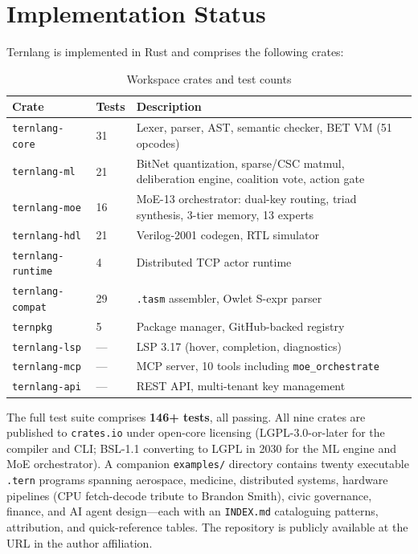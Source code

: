 \documentclass[journal,10pt,twocolumn]{IEEEtran}
\begin{document}
\section{Implementation Status}
\label{sec:status}

Ternlang is implemented in Rust and comprises the following crates:

\begin{table}[h]
\centering
\small
\caption{Workspace crates and test counts}
\label{tab:status}
\begin{tabular}{p{2.4cm}lp{4.0cm}}
\toprule
Crate & Tests & Description \\
\midrule
\texttt{ternlang-core}    & 31  & Lexer, parser, AST, semantic checker, BET VM (51 opcodes) \\
\texttt{ternlang-ml}      & 21  & BitNet quantization, sparse/CSC matmul, deliberation engine, coalition vote, action gate \\
\texttt{ternlang-moe}     & 16  & MoE-13 orchestrator: dual-key routing, triad synthesis, 3-tier memory, 13 experts \\
\texttt{ternlang-hdl}     & 21  & Verilog-2001 codegen, RTL simulator \\
\texttt{ternlang-runtime} & 4   & Distributed TCP actor runtime \\
\texttt{ternlang-compat}  & 29  & \texttt{.tasm} assembler, Owlet S-expr parser \\
\texttt{ternpkg}          & 5   & Package manager, GitHub-backed registry \\
\texttt{ternlang-lsp}     & ---  & LSP 3.17 (hover, completion, diagnostics) \\
\texttt{ternlang-mcp}     & ---  & MCP server, 10 tools including \texttt{moe\_orchestrate} \\
\texttt{ternlang-api}     & ---  & REST API, multi-tenant key management \\
\bottomrule
\end{tabular}
\end{table}

The full test suite comprises \textbf{146+ tests}, all passing.
All nine crates are published to \texttt{crates.io} under open-core
licensing (LGPL-3.0-or-later for the compiler and CLI; BSL-1.1 converting
to LGPL in 2030 for the ML engine and MoE orchestrator). A companion
\texttt{examples/} directory contains twenty executable \texttt{.tern}
programs spanning aerospace, medicine, distributed systems, hardware
pipelines (CPU fetch-decode tribute to Brandon Smith), civic governance,
finance, and AI agent design—each with an \texttt{INDEX.md} cataloguing
patterns, attribution, and quick-reference tables. The repository is
publicly available at the URL in the author affiliation.
\end{document}
